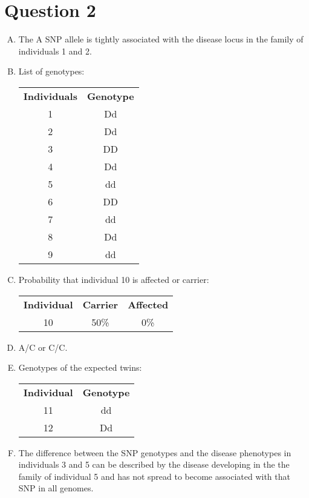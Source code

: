 \documentclass{article}
\begin{document}
\section*{Question 2}

\begin{enumerate}[A.]
    \item The A SNP allele is tightly associated with the disease locus in the
        family of individuals 1 and 2.
    
    \item List of genotypes:
    \begin{center}\begin{tabular}{c c}
        \textbf{Individuals} & \textbf{Genotype} \\
        1 & Dd \\
        2 & Dd \\
        3 & DD \\
        4 & Dd \\
        5 & dd \\
        6 & DD \\
        7 & dd \\
        8 & Dd \\
        9 & dd
    \end{tabular}\end{center}
    
    \item Probability that individual 10 is affected or carrier:
    \begin{center}
        \begin{tabular}{c c c}
            \textbf{Individual} & \textbf{Carrier} & \textbf{Affected} \\
            10 & 50\% & 0\%
        \end{tabular}
    \end{center}
    
    \item A/C or C/C.
    
    \item Genotypes of the expected twins:
    \begin{center}
        \begin{tabular}{c c}
            \textbf{Individual} & \textbf{Genotype} \\
            11 & dd \\
            12 & Dd \\
        \end{tabular}
    \end{center}
    
    \item The difference between the SNP genotypes and the disease phenotypes in
        individuals 3 and 5 can be described by the disease developing in the
        the family of individual 5 and has not spread to become associated with
        that SNP in all genomes.
    
\end{enumerate}
\end{document}
